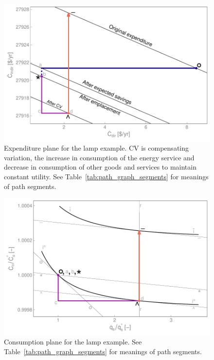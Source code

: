 \documentclass[12pt]{article}\usepackage[]{graphicx}\usepackage[]{xcolor}
\makeatletter
\def\maxwidth{ %
  \ifdim\Gin@nat@width>\linewidth
    \linewidth
  \else
    \Gin@nat@width
  \fi
}
\newenvironment{knitrout}{}{} %
\makeatother
\begin{document}
\begin{knitrout}
\color{fgcolor}\begin{figure}

{\centering \includegraphics[width=\maxwidth]{figure/LampCostGraph-1} 

}

\caption{Expenditure plane for the lamp example. CV is compensating variation, the increase in consumption of the energy service and decrease in consumption of other goods and services to maintain constant utility. See Table~\ref{tab:path_graph_segments} for meanings of path segments.}\label{fig:LampCostGraph}
\end{figure}

\end{knitrout}


\begin{knitrout}
\color{fgcolor}\begin{figure}

{\centering \includegraphics[width=\maxwidth]{figure/LampConsGraph-1} 

}

\caption{Consumption plane for the lamp example. See Table~\ref{tab:path_graph_segments} for meanings of path segments.}\label{fig:LampConsGraph}
\end{figure}

\end{knitrout}
\end{document}
